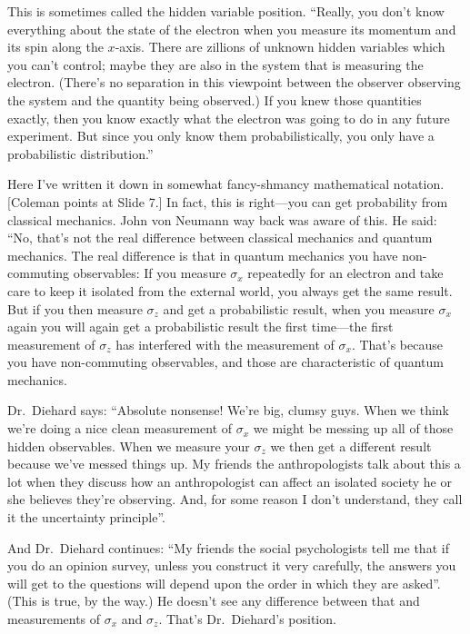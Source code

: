 \documentclass[twocolumn,prb]{revtex4}
\begin{document}
This is sometimes called the hidden variable position.  ``Really, you don't know everything about the state of the electron when you measure its momentum and its spin along the $x$-axis. There are zillions of unknown hidden variables which you can't control; maybe they are also in the system that is measuring the electron. (There's no separation in this viewpoint between the observer observing the system and the quantity being observed.) If you knew those quantities exactly, then you know exactly what the electron was going to do in any future experiment. But since you only know them probabilistically, you only have a probabilistic distribution.''

Here I've written it down in somewhat fancy-shmancy mathematical notation. [Coleman points at Slide 7.]  In fact, this is right---you can get probability from classical mechanics. John von Neumann way back was aware of this. He said: ``No, that's not the real difference between classical mechanics and quantum mechanics. The real difference is that in quantum mechanics you have non-commuting observables:  If you measure $\sigma_x$ repeatedly for an electron and take care to keep it isolated from the external world, you always get the same result.  But if you then measure $\sigma_z$ and get a probabilistic result, when you measure $\sigma_x$ again you will again get a probabilistic result the first time---the first measurement of $\sigma_z$ has interfered with the measurement of $\sigma_x$. That's because you have non-commuting observables, and those are characteristic of quantum mechanics.

Dr.\ Diehard says: ``Absolute nonsense! We're big, clumsy guys. When we think we're doing a nice clean measurement of $\sigma_x$ we might be messing up all of those hidden observables. When we measure your $\sigma_z$ we then get a different result because we've messed things up. My friends the anthropologists talk about this a lot when they discuss how an anthropologist can affect an isolated society he or she believes they're observing. And, for some reason I don't understand, they call it the uncertainty principle''.

And Dr.\ Diehard continues: ``My friends the social psychologists tell me that if you do an opinion survey, unless you construct it very carefully, the answers you will get to the questions will depend upon the order in which they are asked''. (This is true, by the way.) He doesn't see any difference between that and measurements of $\sigma_x$ and $\sigma_z$. That's Dr.\ Diehard's position.
\end{document}
